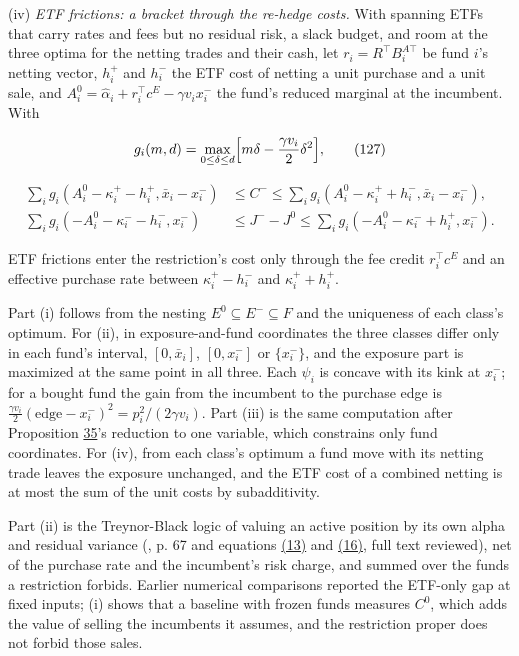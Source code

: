 \documentclass[11pt]{article}
\begin{document}
(iv) \emph{ETF frictions: a bracket through the re-hedge costs.} With
spanning ETFs that carry rates and fees but no residual risk, a slack
budget, and room at the three optima for the netting trades and their
cash, let \(r_i=R^\top B^{A\top}_i\) be fund \(i\)'s netting vector, \(h^+_i\) and \(h^-_i\)
the ETF cost of netting a unit purchase and a unit sale, and
\(A^0_i=\hat\alpha_i+r_i^\top c^E-\gamma v_ix^-_i\) the fund's reduced marginal at the incumbent.
With

\begin{equation*}
g_i(m,d)=\max_{0\leq\delta\leq d}\Bigl[m\delta-\frac{\gamma v_i}2\delta^2\Bigr],\tag{127}\label{eq:127}
\end{equation*}

\begin{equation*}
\begin{aligned}
\textstyle\sum_ig_i(A^0_i-\kappa^+_i-h^+_i,\bar x_i-x^-_i)&\leq C^-\leq\textstyle\sum_ig_i(A^0_i-\kappa^+_i+h^-_i,\bar x_i-x^-_i),\\
\textstyle\sum_ig_i(-A^0_i-\kappa^-_i-h^-_i,x^-_i)&\leq J^--J^0\leq\textstyle\sum_ig_i(-A^0_i-\kappa^-_i+h^+_i,x^-_i).
\end{aligned}\tag{128}\label{eq:128}
\end{equation*}

ETF frictions enter the restriction's cost only through the fee credit
\(r_i^\top c^E\) and an effective purchase rate between \(\kappa^+_i-h^-_i\) and \(\kappa^+_i+h^+_i\).

Part (i) follows from the nesting \(E^0\subseteq E^-\subseteq F\) and the uniqueness of
each class's optimum. For (ii), in exposure-and-fund coordinates the
three classes differ only in each fund's interval, \([0,\bar x_i]\), \([0,x^-_i]\)
or \(\{x^-_i\}\), and the exposure part is maximized at the same point in
all three. Each \(\psi_i\) is concave with its kink at \(x^-_i\); for a bought fund
the gain from the incumbent to the purchase edge is
\(\frac{\gamma v_i}2(\text{edge}-x^-_i)^2=p_i^2/(2\gamma v_i)\). Part (iii) is the same computation
after Proposition \hyperref[res:Proposition-35]{35}'s reduction to one variable, which constrains
only fund coordinates. For (iv), from each class's optimum a fund move
with its netting trade leaves the exposure unchanged, and the ETF cost
of a combined netting is at most the sum of the unit costs by
subadditivity.

Part (ii) is the Treynor-Black logic of valuing an active position by
its own alpha and residual variance (\cite{treynor1973security}, p. 67 and
equations \hyperref[eq:13]{(13)} and \hyperref[eq:16]{(16)}, full text reviewed), net of the purchase rate
and the incumbent's risk charge, and summed over the funds a
restriction forbids. Earlier numerical comparisons reported the
ETF-only gap at fixed inputs; (i) shows that a baseline with
frozen funds measures \(C^0\), which adds the value of selling the
incumbents it assumes, and the restriction proper does not forbid
those sales.
\end{document}
